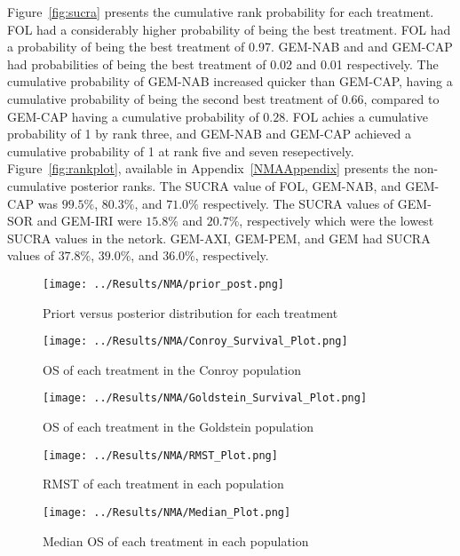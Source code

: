 Figure~\ref{fig:sucra} presents the cumulative rank probability for each treatment. FOL had a considerably higher probability of being the best treatment. FOL had a probability of being the best treatment of 0.97. GEM-NAB and and GEM-CAP had probabilities of being the best treatment of 0.02 and 0.01 respectively. The cumulative probability of GEM-NAB increased quicker than GEM-CAP, having a cumulative probability of being the second best treatment of 0.66, compared to GEM-CAP having a cumulative probability of $0.28$. FOL achies a cumulative probability of 1 by rank three, and GEM-NAB and GEM-CAP achieved a cumulative probability of 1 at rank five and seven resepectively. Figure~\ref{fig:rankplot}, available in Appendix~\ref{NMAAppendix} presents the non-cumulative posterior ranks. The SUCRA value of FOL, GEM-NAB, and GEM-CAP was $99.5\%$, $80.3\%$, and $71.0\%$ respectively. The SUCRA values of GEM-SOR and GEM-IRI were $15.8\%$ and $20.7\%$, respectively which were the lowest SUCRA values in the netork. GEM-AXI, GEM-PEM, and GEM had SUCRA values of $37.8\%$, $39.0\%$, and $36.0\%$, respectively. 

\begin{figure}[h]
    \centering
    \texttt{[image: ../Results/NMA/prior\_post.png]}
    \caption{Priort versus posterior distribution for each treatment}
    \label{fig:prior_post}
\end{figure}

\begin{figure}[h]
    \centering
    \texttt{[image: ../Results/NMA/Conroy\_Survival\_Plot.png]}
    \caption{OS of each treatment in the Conroy population}
    \label{fig:pred_survbc_conroy}
\end{figure}

\begin{figure}[h]
    \centering
    \texttt{[image: ../Results/NMA/Goldstein\_Survival\_Plot.png]}
    \caption{OS of each treatment in the Goldstein population}
    \label{fig:pred_survbc_goldstein}
\end{figure}

\begin{figure}[h]
    \centering
    \texttt{[image: ../Results/NMA/RMST\_Plot.png]}
    \caption{RMST of each treatment in each population}
    \label{fig:pred_rmstbc}
\end{figure}

\begin{figure}[h]
    \centering
    \texttt{[image: ../Results/NMA/Median\_Plot.png]}
    \caption{Median OS of each treatment in each population}
    \label{fig:pred_medianbc}
\end{figure}

